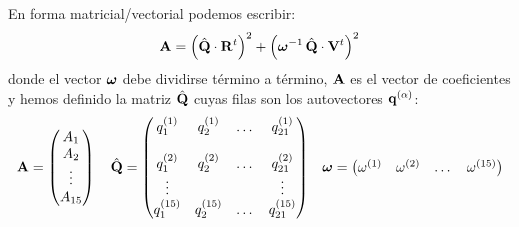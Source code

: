 En forma matricial/vectorial podemos escribir:
\begin{align*}
  \mathbf{A} = \left( \hat{\mathbf{Q}} \cdot \mathbf{R}^{t} \right)^{2} + \left( \boldsymbol{\omega}^{-1}\, \hat{\mathbf{Q}} \cdot \mathbf{V}^{t} \right)^{2} 
\end{align*}
donde el vector $\boldsymbol{\omega}$ debe dividirse t\'{e}rmino a t\'{e}rmino, $\mathbf{A}$ es el vector de coeficientes y hemos definido la matriz $\hat{\mathbf{Q}}$ cuyas filas son los autovectores $\mathbf{q}^{(\alpha)}$:
\begin{align*}
  \mathbf{A}=\begin{pmatrix} A_{1} \\ A_{2} \\ \vdots \\ A_{15}   \end{pmatrix}\, & & \hat{\mathbf{Q}} = \begin{pmatrix} 
q^{(1)}_{1} & q^{(1)}_{2} & \dots & q^{(1)}_{21} \\
&&&\\
q^{(2)}_{1} & q^{(2)}_{2} & \dots & q^{(2)}_{21} \\
\vdots &  &  & \vdots \\
q^{(15)}_{1} & q^{(15)}_{2} & \dots & q^{(15)}_{21} 
\end{pmatrix} &&
\boldsymbol{\omega} = \begin{pmatrix} \omega^{(1)} & \omega^{(2)} & \dots & \omega^{(15)}  \end{pmatrix}
\end{align*}
